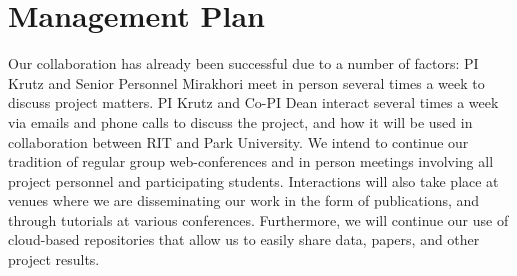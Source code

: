\documentclass[11pt]{article}
\begin{document}
%


\section{Management Plan}


%

Our collaboration has already been successful due to a number of factors: PI Krutz and Senior Personnel Mirakhori meet in person several times a week to discuss project matters. PI Krutz and Co-PI Dean interact several times a week via emails and phone calls to discuss the project, and how it will be used in collaboration between RIT and Park University. We intend to continue our tradition of regular group web-conferences and in person meetings involving all project personnel and participating students. Interactions will also take place at venues where we are disseminating our work in the form of publications, and through tutorials at various conferences. Furthermore, we will continue our use of cloud-based repositories that allow us to easily share data, papers, and other project results.
\end{document}
